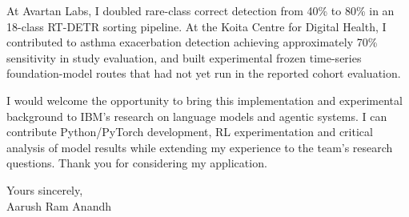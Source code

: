\documentclass[11pt,a4paper]{article}
\begin{document}
At Avartan Labs, I doubled rare-class correct detection from 40\% to 80\% in an 18-class RT-DETR sorting pipeline. At the Koita Centre for Digital Health, I contributed to asthma exacerbation detection achieving approximately 70\% sensitivity in study evaluation, and built experimental frozen time-series foundation-model routes that had not yet run in the reported cohort evaluation.\par\vspace{10pt}
I would welcome the opportunity to bring this implementation and experimental background to IBM's research on language models and agentic systems. I can contribute Python/PyTorch development, RL experimentation and critical analysis of model results while extending my experience to the team's research questions. Thank you for considering my application.\par\vspace{14pt}
Yours sincerely,\\[5pt]
Aarush Ram Anandh
\end{document}
